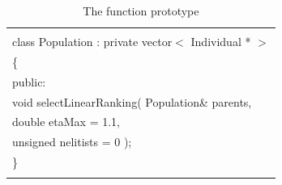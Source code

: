 \documentclass[twocolumn]{article}
\begin{document}
\begin{table}[h]
\begin{center}
\caption{The function prototype}
\label{FP4}
{\scriptsize
\begin{tabular}{|l|}\hline
\hspace*{7cm}\\
class Population : private vector$<$ Individual * $>$\\
\{\\
\hspace*{4mm} public:\\
\hspace*{8mm} void selectLinearRanking( Population\& parents, \\
\hspace*{12mm} double etaMax = 1.1,\\
\hspace*{12mm} unsigned nelitists = 0 );\\
\}\\ 
\hspace*{7cm}\\\hline
\end{tabular}
}
\end{center}
\end{table}
\end{document}
